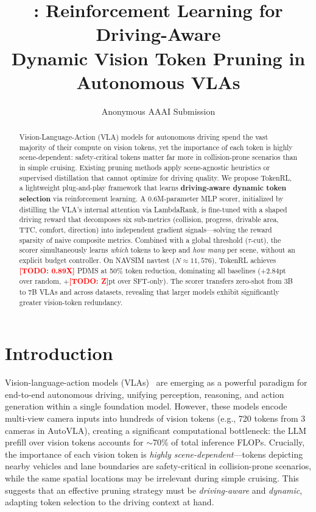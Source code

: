 \documentclass[letterpaper]{article} %
\title{\ours{}: Reinforcement Learning for Driving-Aware\\Dynamic Vision Token Pruning in Autonomous VLAs}
\author{
    Anonymous AAAI Submission
}
\newcommand{\ours}{TokenRL}
\newcommand{\todo}[1]{\textcolor{red}{\textbf{[TODO: #1]}}}
\begin{document}
\maketitle

\begin{abstract}
Vision-Language-Action (VLA) models for autonomous driving spend the vast majority of their compute on vision tokens, yet the importance of each token is highly scene-dependent: safety-critical tokens matter far more in collision-prone scenarios than in simple cruising.
Existing pruning methods apply scene-agnostic heuristics or supervised distillation that cannot optimize for driving quality.
We propose \ours{}, a lightweight plug-and-play framework that learns \textbf{driving-aware dynamic token selection} via reinforcement learning.
A 0.6M-parameter MLP scorer, initialized by distilling the VLA's internal attention via LambdaRank, is fine-tuned with a shaped driving reward that decomposes six sub-metrics (collision, progress, drivable area, TTC, comfort, direction) into independent gradient signals---solving the reward sparsity of naive composite metrics.
Combined with a global threshold ($\tau$-cut), the scorer simultaneously learns \emph{which} tokens to keep and \emph{how many} per scene, without an explicit budget controller.
On NAVSIM navtest ($N{\approx}11{,}576$), \ours{} achieves \todo{0.89X} PDMS at 50\% token reduction, dominating all baselines ($+2.84$pt over random, $+$\todo{Z}pt over SFT-only).
The scorer transfers zero-shot from 3B to 7B VLAs and across datasets, revealing that larger models exhibit significantly greater vision-token redundancy.
\end{abstract}

\section{Introduction}
\label{sec:intro}

Vision-language-action models (VLAs)~\citep{autovla2025} are emerging as a powerful paradigm for end-to-end autonomous driving, unifying perception, reasoning, and action generation within a single foundation model.
However, these models encode multi-view camera inputs into hundreds of vision tokens (e.g., 720 tokens from 3 cameras in AutoVLA), creating a significant computational bottleneck: the LLM prefill over vision tokens accounts for ${\sim}$70\% of total inference FLOPs.
Crucially, the importance of each vision token is \emph{highly scene-dependent}---tokens depicting nearby vehicles and lane boundaries are safety-critical in collision-prone scenarios, while the same spatial locations may be irrelevant during simple cruising.
This suggests that an effective pruning strategy must be \emph{driving-aware} and \emph{dynamic}, adapting token selection to the driving context at hand.
\end{document}
